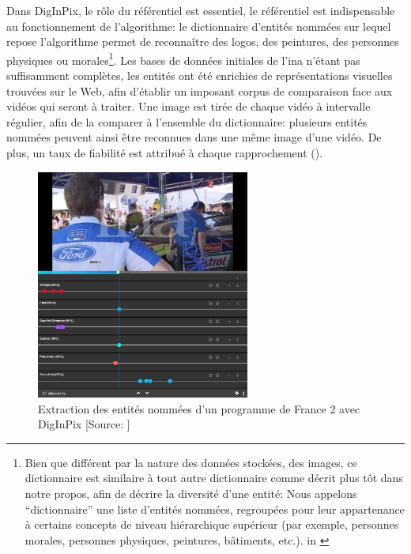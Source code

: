 Dans DigInPix, le rôle du référentiel est essentiel, le référentiel est indispensable au fonctionnement de l'algorithme: le dictionnaire d'entités nommées sur lequel repose l'algorithme permet de reconnaître des logos, des peintures, des personnes physiques ou morales\footnote{Bien que différent par la nature des données stockées, des images, ce dictionnaire est similaire à tout autre dictionnaire comme décrit plus tôt dans notre propos, afin de décrire la diversité d'une entité: \og Nous appelons “dictionnaire” une liste d'entités nommées, regroupées pour leur appartenance à certains concepts de niveau hiérarchique supérieur (par exemple, personnes morales, personnes physiques, peintures, bâtiments, etc.).\fg{} in \cite{institut_national_de_laudiovisuel_diginpix_nodate}}. Les bases de données initiales de l'\ac{ina} n'étant pas suffisamment complètes, les entités ont été enrichies de représentations visuelles trouvées sur le Web, afin d'établir un imposant corpus de comparaison face aux vidéos qui seront à traiter. Une image est tirée de chaque vidéo à intervalle régulier, afin de la comparer à l'ensemble du dictionnaire: plusieurs entités nommées peuvent ainsi être reconnues dans une même image d'une vidéo. De plus, un taux de fiabilité est attribué à chaque rapprochement ().
\begin{figure}[!h]
	\centering
	\includegraphics[width=7cm]{images/diginpix_resultat.jpg}
	\caption[Extraction des entités nommées d'un programme de France 2 avec DigInPix]{Extraction des entités nommées d'un programme de France 2 avec DigInPix [Source: \cite{institut_national_de_laudiovisuel_diginpix_nodate}]}
	\label{diginpix_result}
\end{figure}

